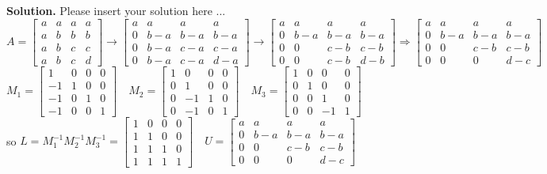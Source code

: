\documentclass[english,onecolumn]{IEEEtran}
\begin{document}
\noindent \textbf{Solution.}
Please insert your solution here ...
\\$A=\left[\begin{array}{llll}
a & a & a & a \\
a & b & b & b \\
a & b & c & c \\
a & b & c & d
\end{array}\right] \rightarrow\left[\begin{array}{llll}
a & a & a & a \\
0 & b-a & b-a & b-a \\
0 & b-a & c-a & c-a \\
0 & b-a & c-a & d-a
\end{array}\right] 
\rightarrow  {\left[\begin{array}{llll}
a & a & a & a \\
0 & b-a & b-a & b-a \\
0 & 0 & c-b & c-b \\
0 & 0 & c-b & d-b
\end{array}\right]}  \Rightarrow\left[\begin{array}{cccc}
a & a & a & a \\
0 & b-a & b-a & b-a \\
0 & 0 & c-b & c-b \\
0 & 0 & 0 & d-c
\end{array}\right]$
\\$M_{1}=\left[\begin{array}{rrrr}
1 & 0 & 0 & 0 \\
-1 & 1 & 0 & 0 \\
-1 & 0 & 1 & 0 \\
-1 & 0 & 0 & 1
\end{array}\right] \quad M_{2}=\left[\begin{array}{rrrr}
1 & 0 & 0 & 0 \\
0 & 1 & 0 & 0 \\
0 & -1 & 1 & 0 \\
0 & -1 & 0 & 1
\end{array}\right] \quad
M_{3}=\left[\begin{array}{llll}
1 & 0 & 0 & 0 \\
0 & 1 & 0 & 0 \\
0 & 0 & 1 & 0 \\
0 & 0 & -1 & 1
\end{array}\right]$
\\so $L=M_{1}^{-1}M_{2}^{-1}M_{3}^{-1}=\left[\begin{array}{llll}
1 & 0 & 0 & 0 \\
1 & 1 & 0 & 0 \\
1 & 1 & 1 & 0 \\
1 & 1 & 1 & 1
\end{array}\right] \quad U=\left[\begin{array}{cccc}
a & a & a & a \\
0 & b-a & b-a & b-a \\
0 & 0 & c-b & c-b \\
0 & 0 & 0 & d-c
\end{array}\right]$
\end{document}
